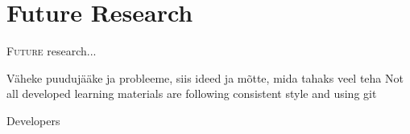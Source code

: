 \chapter{Future Research}
\label{Future Research}

\lettrine[lraise=0.1, nindent=0em, slope=-.5em]{\color{Violet}F}{uture} research...

{\color{red} Väheke puudujääke ja probleeme, siis ideed ja mõtte, mida tahaks veel teha
Not all developed learning materials are following consistent style and using \gls{git}

Developers }